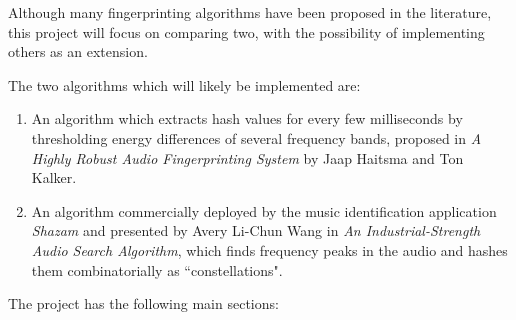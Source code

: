 \documentclass[12pt]{article}
\begin{document}
Although many fingerprinting algorithms have been proposed in the literature, this project will focus on comparing two, with the possibility of implementing others as an extension. 

The two algorithms which will likely be implemented are:

\begin{enumerate}

\item An algorithm which extracts hash values for every few milliseconds by thresholding energy differences of several frequency bands, proposed in \emph{A Highly Robust Audio Fingerprinting System} by Jaap Haitsma and Ton Kalker.

\item An algorithm commercially deployed by the music identification application \emph{Shazam} and presented by Avery Li-Chun Wang in \emph{An Industrial-Strength Audio Search Algorithm}, which finds frequency peaks in the audio and hashes them combinatorially as ``constellations".

\end{enumerate}

The project has the following main sections:
\end{document}
